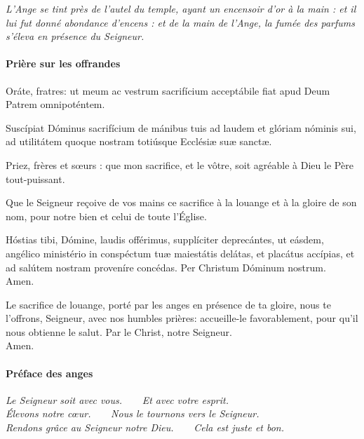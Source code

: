 \documentclass[twoside]{article}
\begin{document}
\emph{L’Ange se tint près de l’autel du temple,
ayant un encensoir d’or à la main :
et il lui fut donné abondance d’encens :
et de la main de l’Ange, la fumée des parfums
s’éleva en présence du Seigneur.}

\paragraph{Prière sur les offrandes}
\begin{paracol}{2}

\vv Oráte, fratres:
ut meum ac vestrum sacrifícium
acceptábile fiat apud Deum Patrem omnipoténtem.

\rr Suscípiat Dóminus sacrifícium de mánibus tuis
ad laudem et glóriam nóminis sui,
ad utilitátem quoque nostram
totiúsque Ecclésiæ suæ sanctæ.

\switchcolumn

\vv Priez, frères et sœurs : que mon sacrifice, et le vôtre, soit agréable à Dieu le Père tout-puissant.

\rr Que le Seigneur reçoive de vos mains ce sacrifice à la louange et à la gloire de son nom, pour notre bien et celui de toute l’Église.

\switchcolumn*

Hóstias tibi, Dómine, laudis offérimus,
supplíciter deprecántes, ut eásdem,
angélico ministério in conspéctum tuæ maiestátis delátas,
et placátus accípias,
et ad salútem nostram proveníre concédas.
Per Christum Dóminum nostrum.\\
\rr Amen.

\switchcolumn
Le sacrifice de louange,
porté par les anges en présence de ta gloire,
nous te l'offrons, Seigneur,
avec nos humbles prières:
accueille-le favorablement,
pour qu'il nous obtienne le salut.
Par le Christ, notre Seigneur.\\
\rr Amen.

\end{paracol}

\paragraph{Préface des anges}


\emph{\vv Le Seigneur soit avec vous.~~~~\rr Et avec votre esprit.\\
\vv Élevons notre cœur.~~~~\rr Nous le tournons vers le Seigneur.\\
\vv Rendons grâce au Seigneur notre Dieu.~~~~\rr Cela est juste et bon.}
\end{document}
